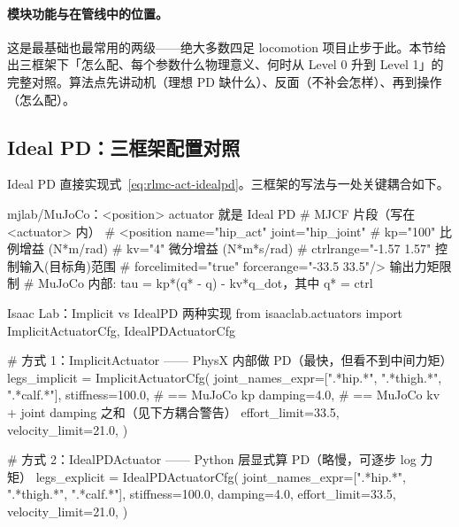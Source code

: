 \paragraph{模块功能与在管线中的位置。}这是最基础也最常用的两级——绝大多数四足 locomotion 项目止步于此。本节给出三框架下「怎么配、每个参数什么物理意义、何时从 Level 0 升到 Level 1」的完整对照。算法点先讲动机（理想 PD 缺什么）、反面（不补会怎样）、再到操作（怎么配）。

\subsection{Ideal PD：三框架配置对照}
\label{sec:rlmc-act-idealpd-cfg}

Ideal PD 直接实现式~\eqref{eq:rlmc-act-idealpd}。三框架的写法与一处关键耦合如下。

\begin{codebox}[Python]{mjlab/MuJoCo：<position> actuator 就是 Ideal PD}
# MJCF 片段（写在 <actuator> 内）
# <position name="hip_act" joint="hip_joint"
#           kp="100"                 比例增益 (N*m/rad)
#           kv="4"                   微分增益 (N*m*s/rad)
#           ctrlrange="-1.57 1.57"   控制输入(目标角)范围
#           forcelimited="true" forcerange="-33.5 33.5"/>  输出力矩限制
# MuJoCo 内部: tau = kp*(q* - q) - kv*q_dot，其中 q* = ctrl
\end{codebox}

\begin{codebox}[Python]{Isaac Lab：Implicit vs IdealPD 两种实现}
from isaaclab.actuators import ImplicitActuatorCfg, IdealPDActuatorCfg

# 方式 1：ImplicitActuator —— PhysX 内部做 PD（最快，但看不到中间力矩）
legs_implicit = ImplicitActuatorCfg(
    joint_names_expr=[".*hip.*", ".*thigh.*", ".*calf.*"],
    stiffness=100.0,     # == MuJoCo kp
    damping=4.0,         # == MuJoCo kv + joint damping 之和（见下方耦合警告）
    effort_limit=33.5, velocity_limit=21.0,
)

# 方式 2：IdealPDActuator —— Python 层显式算 PD（略慢，可逐步 log 力矩）
legs_explicit = IdealPDActuatorCfg(
    joint_names_expr=[".*hip.*", ".*thigh.*", ".*calf.*"],
    stiffness=100.0, damping=4.0, effort_limit=33.5, velocity_limit=21.0,
)
\end{codebox}


